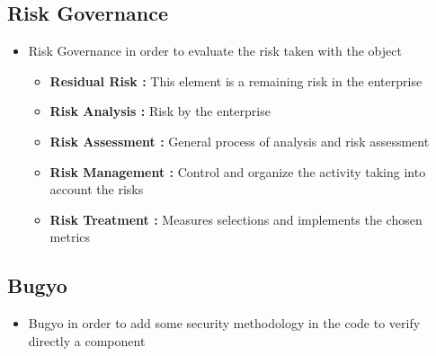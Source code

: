 \documentclass[12pt]{report}
\begin{document}
\subsection*{Risk Governance}
\begin{itemize}
	\item Risk Governance in order to evaluate the risk taken with the object\par

\begin{itemize}
	\item \textbf{Residual Risk : }This element is a remaining risk in the enterprise\par

	\item \textbf{Risk Analysis :} Risk  by the enterprise\par

	\item \textbf{Risk Assessment : } General process of analysis and risk assessment \par

	\item \textbf{Risk Management :  } Control and organize the activity taking into account the risks \par

	\item \textbf{Risk Treatment : } Measures selections and implements the chosen metrics
\end{itemize}\par


\end{itemize}\subsection*{Bugyo }
\begin{itemize}
	\item Bugyo in order to add some security methodology in the code to verify directly a component\par
\end{itemize}
\end{document}
